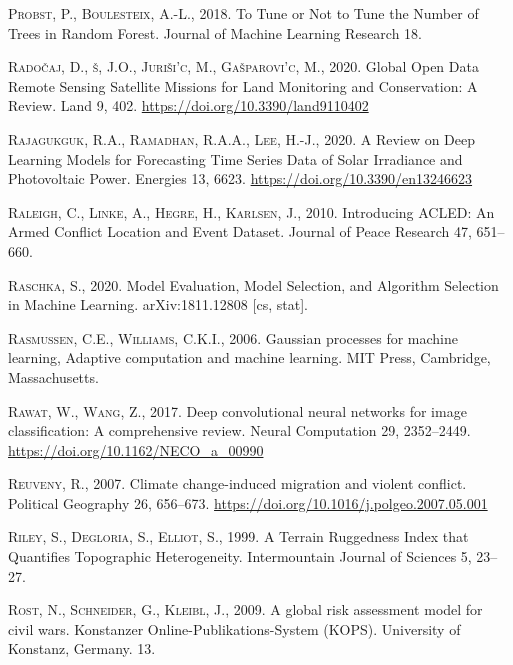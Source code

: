 \documentclass[a4paper,11pt]{article}
\begin{document}
\leavevmode\hypertarget{ref-probst2018}{}%
\textsc{Probst, P., Boulesteix, A.-L.}, 2018. To Tune or Not to Tune the Number of Trees in Random Forest. Journal of Machine Learning Research 18.

\leavevmode\hypertarget{ref-radocaj2020}{}%
\textsc{Radočaj, D., š, J.O., Juriši\a'c, M., Gašparovi\a'c, M.}, 2020. Global Open Data Remote Sensing Satellite Missions for Land Monitoring and Conservation: A Review. Land 9, 402. \url{https://doi.org/10.3390/land9110402}

\leavevmode\hypertarget{ref-rajagukguk2020}{}%
\textsc{Rajagukguk, R.A., Ramadhan, R.A.A., Lee, H.-J.}, 2020. A Review on Deep Learning Models for Forecasting Time Series Data of Solar Irradiance and Photovoltaic Power. Energies 13, 6623. \url{https://doi.org/10.3390/en13246623}

\leavevmode\hypertarget{ref-raleigh2010a}{}%
\textsc{Raleigh, C., Linke, A., Hegre, H., Karlsen, J.}, 2010. Introducing ACLED: An Armed Conflict Location and Event Dataset. Journal of Peace Research 47, 651--660.

\leavevmode\hypertarget{ref-raschka2020}{}%
\textsc{Raschka, S.}, 2020. Model Evaluation, Model Selection, and Algorithm Selection in Machine Learning. arXiv:1811.12808 {[}cs, stat{]}.

\leavevmode\hypertarget{ref-rasmussen2006}{}%
\textsc{Rasmussen, C.E., Williams, C.K.I.}, 2006. Gaussian processes for machine learning, Adaptive computation and machine learning. MIT Press, Cambridge, Massachusetts.

\leavevmode\hypertarget{ref-rawat2017}{}%
\textsc{Rawat, W., Wang, Z.}, 2017. Deep convolutional neural networks for image classification: A comprehensive review. Neural Computation 29, 2352--2449. \url{https://doi.org/10.1162/NECO_a_00990}

\leavevmode\hypertarget{ref-reuveny2007}{}%
\textsc{Reuveny, R.}, 2007. Climate change-induced migration and violent conflict. Political Geography 26, 656--673. \url{https://doi.org/10.1016/j.polgeo.2007.05.001}

\leavevmode\hypertarget{ref-riley1999}{}%
\textsc{Riley, S., Degloria, S., Elliot, S.}, 1999. A Terrain Ruggedness Index that Quantifies Topographic Heterogeneity. Intermountain Journal of Sciences 5, 23--27.

\leavevmode\hypertarget{ref-rost2009}{}%
\textsc{Rost, N., Schneider, G., Kleibl, J.}, 2009. A global risk assessment model for civil wars. Konstanzer Online-Publikations-System (KOPS). University of Konstanz, Germany. 13.
\end{document}
